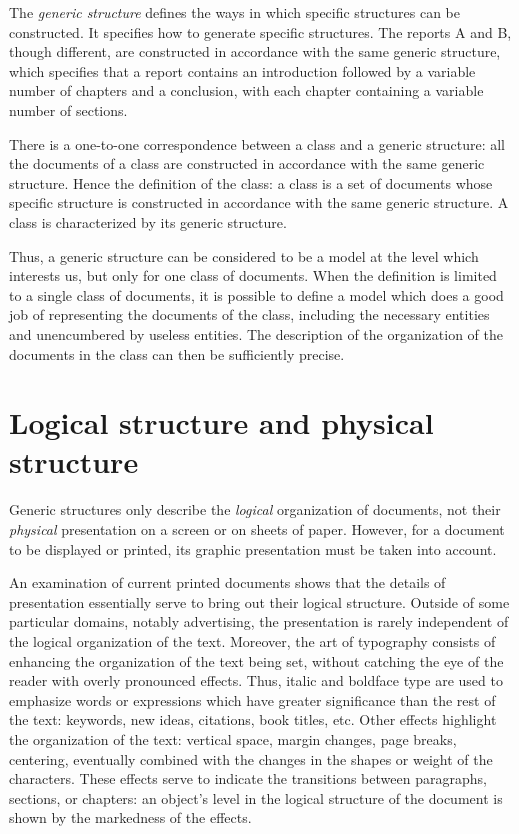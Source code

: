 The {\em generic structure} defines the ways in which specific
structures can be constructed.  It specifies how to generate specific
structures.  The reports A and B, though different, are constructed
in accordance with the same generic structure, which specifies that a
report contains an introduction followed by a variable number of
chapters and a conclusion, with each chapter containing a variable
number of sections.

There is a one-to-one correspondence between a class and a generic
structure: all the documents of a class are constructed in accordance
with the same generic structure.  Hence the definition of the class: a
class is a set of documents whose specific structure is constructed in
accordance with the same generic structure.  A class is characterized
by its generic structure.

Thus, a generic structure can be considered to be a model at the level
which interests us, but only for one class of documents.  When the
definition is limited to a single class of documents, it is possible
to define a model which does a good job of representing the documents
of the class, including the necessary entities and unencumbered by
useless entities.  The description of the organization of the
documents in the class can then be sufficiently precise.

\section{Logical structure and physical structure}

Generic structures only describe the {\em logical} organization of
documents, not their {\em physical} presentation on a screen or on
sheets of paper.  However, for a document to be displayed or printed,
its graphic presentation must be taken into account.

An examination of current printed documents shows that the details of
presentation essentially serve to bring out their logical structure.
Outside of some particular domains, notably advertising, the
presentation is rarely independent of the logical organization of the
text.  Moreover, the art of typography consists of enhancing the
organization of the text being set, without catching the eye of the
reader with overly pronounced effects.  Thus, italic and boldface type
are used to emphasize words or expressions which have greater
significance than the rest of the text: keywords, new ideas,
citations, book titles, etc.  Other effects highlight the organization
of the text: vertical space, margin changes, page breaks, centering,
eventually combined with the changes in the shapes or weight of the
characters. These effects serve to indicate the transitions between
paragraphs, sections, or chapters: an object's level in the logical
structure of the document is shown by the markedness of the effects.

